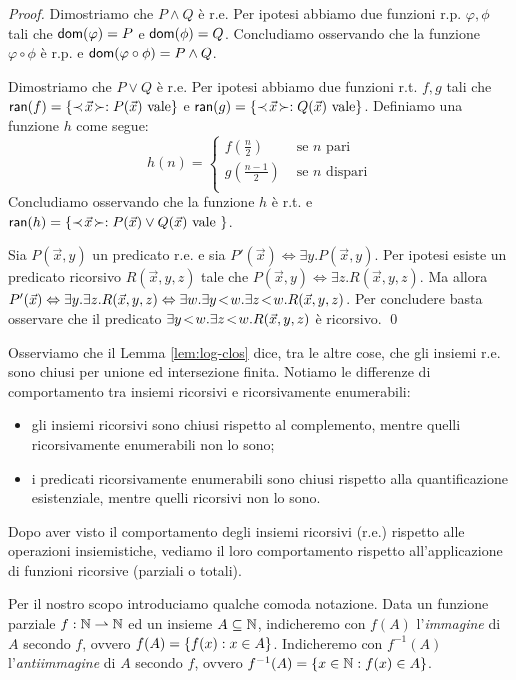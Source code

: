 \documentclass[runningheads,a4paper]{llncs}
\begin{document}
\begin{proof}
Dimostriamo che $P \wedge Q$ \`{e} r.e. Per ipotesi abbiamo due funzioni r.p. $\varphi,\phi$ tali che 
 $\mathsf{dom}(\varphi) = P$ e $\mathsf{dom}(\phi) = Q$. Concludiamo osservando che la funzione $\varphi \circ \phi$ \`{e} r.p. e
 $\mathsf{dom}(\varphi \circ \phi) = P \wedge Q$.

Dimostriamo che $P \vee Q$ \`{e} r.e. Per ipotesi abbiamo due funzioni r.t. $f,g$ tali che
 $\mathsf{ran}(f) = \{\prec\! \vec x \!\succ : P(\vec x) \mbox{ vale} \}$ e $\mathsf{ran}(g) = \{\prec\! \vec x \!\succ : Q(\vec x) \mbox{ vale} \}$.
 Definiamo una funzione $h$ come segue:
$$
h(n) = 
\begin{cases}
f(\frac{n}{2})   & \mbox{ se $n$ pari} \\
g(\frac{n-1}{2}) & \mbox{ se $n$ dispari} \\
\end{cases}
$$
Concludiamo osservando che la funzione $h$ \`{e} r.t. e $\mathsf{ran}(h) = \{\prec\! \vec x \!\succ : P(\vec x) \vee Q(\vec x) \mbox{ vale } \}$.

Sia $P(\vec x,y)$ un predicato r.e. e sia $P'(\vec x) \iff \exists y.P(\vec x,y)$. Per ipotesi esiste un predicato ricorsivo
 $R(\vec x,y,z)$ tale che $P(\vec x,y) \iff \exists z.R(\vec x,y,z)$. Ma allora
 $P'(\vec x) \Leftrightarrow \exists y.\exists z.R(\vec x,y,z) \Leftrightarrow \exists w.\exists{y}\!<\!{w}.\exists{z}\!<\!{w}.R(\vec x,y,z)$.
 Per concludere basta osservare che il predicato $\exists{y}\!<\!{w}.\exists{z}\!<\!{w}.R(\vec x,y,z)$ \`{e} ricorsivo.
\qed\end{proof}

Osserviamo che il Lemma \ref{lem:log-clos} dice, tra le altre cose, che gli insiemi r.e. sono chiusi per unione ed intersezione
 finita. Notiamo le differenze di comportamento tra insiemi ricorsivi e ricorsivamente enumerabili:

\begin{itemize}
\item gli insiemi ricorsivi sono chiusi rispetto al complemento, mentre quelli ricorsivamente enumerabili non lo sono;
\item i predicati ricorsivamente enumerabili sono chiusi rispetto alla quantificazione esistenziale, mentre quelli ricorsivi non lo sono.
\end{itemize}

Dopo aver visto il comportamento degli insiemi ricorsivi (r.e.) rispetto alle operazioni insiemistiche, vediamo il loro comportamento
 rispetto all'applicazione di funzioni ricorsive (parziali o totali).

Per il nostro scopo introduciamo qualche comoda notazione.
 Data un funzione parziale $f: \mathbb{N} \rightharpoonup \mathbb{N}$ ed un insieme $A \subseteq \mathbb{N}$, indicheremo con $f(A)$ l'\emph{immagine}
 di $A$ secondo $f$, ovvero $f(A) = \{f(x) : x \in A\}$. Indicheremo con $f^{-1}(A)$ l'\emph{antiimmagine}
 di $A$ secondo $f$, ovvero $f^{-1}(A) = \{x \in \mathbb{N} : f(x) \in A\}$.
\end{document}
